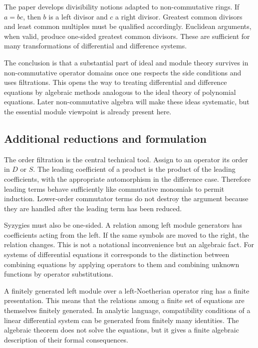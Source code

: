 \documentclass[11pt]{article}
\begin{document}
The paper develops divisibility notions adapted to non-commutative rings. If \(a=bc\), then \(b\) is
a left divisor and \(c\) a right divisor. Greatest common divisors and least common multiples must
be qualified accordingly. Euclidean arguments, when valid, produce one-sided greatest common
divisors. These are sufficient for many transformations of differential and difference systems.


The conclusion is that a substantial part of ideal and module theory survives in non-commutative
operator domains once one respects the side conditions and uses filtrations. This opens the way to
treating differential and difference equations by algebraic methods analogous to the ideal theory of
polynomial equations. Later non-commutative algebra will make these ideas systematic, but the
essential module viewpoint is already present here.


\subsection{Additional reductions and formulation}

The order filtration is the central technical tool. Assign to an operator its order in \(D\) or
\(S\). The leading coefficient of a product is the product of the leading coefficients, with the
appropriate automorphism in the difference case. Therefore leading terms behave sufficiently like
commutative monomials to permit induction. Lower-order commutator terms do not destroy the argument
because they are handled after the leading term has been reduced.

Syzygies must also be one-sided. A relation among left module generators has coefficients acting
from the left. If the same symbols are moved to the right, the relation changes. This is not a
notational inconvenience but an algebraic fact. For systems of differential equations it corresponds
to the distinction between combining equations by applying operators to them and combining unknown
functions by operator substitutions.

A finitely generated left module over a left-Noetherian operator ring has a finite presentation.
This means that the relations among a finite set of equations are themselves finitely generated. In
analytic language, compatibility conditions of a linear differential system can be generated from
finitely many identities. The algebraic theorem does not solve the equations, but it gives a finite
algebraic description of their formal consequences.
\end{document}
